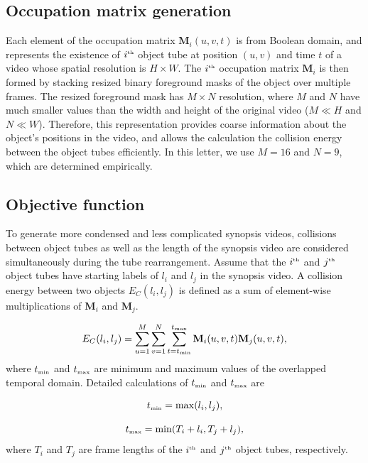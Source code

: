 \documentclass[11pt]{hyu_thesis}
\begin{document}
\subsection{Occupation matrix generation}
\label{sec:occ_mat_gen}
Each element of the occupation matrix $\textbf{M}_i (u,v,t)$ is from Boolean domain, and represents the existence of $i^\textrm{\tiny{th}}$ object tube at position $(u,v)$ and time $t$ of a video whose spatial resolution is $H \times W$. The $i^\textrm{\tiny{th}}$ occupation matrix $\textbf{M}_i$ is then formed by stacking resized binary foreground masks of the object over multiple frames. The resized foreground mask has $M \times N$ resolution, where $M$ and $N$ have much smaller values than the width and height of the original video ($M \ll H$ and $N \ll W$). Therefore, this representation provides coarse information about the object's positions in the video, and allows the calculation the collision energy between the object tubes efficiently. In this letter, we use $M=16$ and $N=9$, which are determined empirically.

\subsection{Objective function}
To generate more condensed and less complicated synopsis videos, collisions between object tubes as well as the length of the synopsis video are considered simultaneously during the tube rearrangement. Assume that the $i^\textrm{\tiny{th}}$ and $j^\textrm{\tiny{th}}$ object tubes have starting labels of $l_i$ and $l_j$ in the synopsis video. A collision energy between two objects $E_C (l_i,l_j)$ is defined as a sum of element-wise multiplications of $\textbf{M}_i$ and $\textbf{M}_j$.

\begin{equation}
\label{eq:collision_cost}
E_C(l_i,l_j) = \sum_{u=1}^{M}\sum_{v=1}^{N}\sum_{t=t_\textrm{\tiny{min}}}^{t_\textrm{\tiny{max}}} \textbf{M}_i(u,v,t)\textbf{M}_j(u,v,t),
\end{equation}
where $t_\textrm{\tiny{min}}$ and $t_\textrm{\tiny{max}}$ are minimum and maximum values of the overlapped temporal domain. Detailed calculations of $t_\textrm{\tiny{min}}$ and $t_\textrm{\tiny{max}}$ are

\begin{equation}
\label{eq:t_min}
t_\textrm{\tiny{min}} = \max(l_i, l_j),
\end{equation}

\begin{equation}
\label{eq:t_max}
t_\textrm{\tiny{max}} = \min(T_i + l_i, T_j + l_j),
\end{equation}
where $T_i$ and $T_j$ are frame lengths of the $i^\textrm{\tiny{th}}$ and $j^\textrm{\tiny{th}}$ object tubes, respectively.
\end{document}
